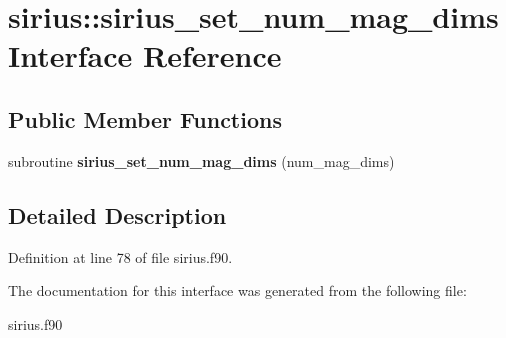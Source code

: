\hypertarget{interfacesirius_1_1sirius__set__num__mag__dims}{}\section{sirius\+:\+:sirius\+\_\+set\+\_\+num\+\_\+mag\+\_\+dims Interface Reference}
\label{interfacesirius_1_1sirius__set__num__mag__dims}
\subsection*{Public Member Functions}
\begin{DoxyCompactItemize}
\item 
\hypertarget{interfacesirius_1_1sirius__set__num__mag__dims_a8a6c169982e1955c80e4db9f1398f60a}{}subroutine {\bfseries sirius\+\_\+set\+\_\+num\+\_\+mag\+\_\+dims} (num\+\_\+mag\+\_\+dims)\label{interfacesirius_1_1sirius__set__num__mag__dims_a8a6c169982e1955c80e4db9f1398f60a}

\end{DoxyCompactItemize}


\subsection{Detailed Description}


Definition at line 78 of file sirius.\+f90.



The documentation for this interface was generated from the following file\+:\begin{DoxyCompactItemize}
\item 
sirius.\+f90\end{DoxyCompactItemize}

